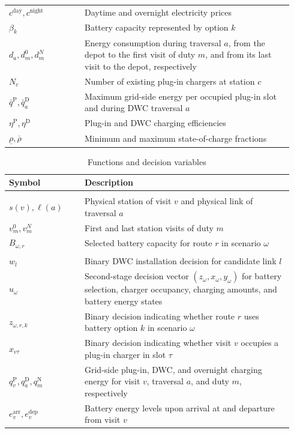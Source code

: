 \begin{table}[htbp]
\begin{tabular}{@{}>{\raggedright\arraybackslash}p{0.25\linewidth}>{\raggedright\arraybackslash}p{0.69\linewidth}@{}}
$c^{\mathrm{day}},c^{\mathrm{night}}$ & Daytime and overnight electricity prices \\
$\beta_k$ & Battery capacity represented by option $k$ \\
$d_a,d_m^0,d_m^N$ & Energy consumption during traversal $a$, from the depot to the first visit of duty $m$, and from its last visit to the depot, respectively \\
$N_c$ & Number of existing plug-in chargers at station $c$ \\
$\bar q^{\mathrm P},\bar q_a^{\mathrm D}$ & Maximum grid-side energy per occupied plug-in slot and during DWC traversal $a$ \\
$\eta^{\mathrm P},\eta^{\mathrm D}$ & Plug-in and DWC charging efficiencies \\
$\underline\rho,\overline\rho$ & Minimum and maximum state-of-charge fractions \\
\bottomrule
\end{tabular}
\end{table}

\begin{table}[htbp]
\centering
\footnotesize
\setlength{\tabcolsep}{3pt}
\renewcommand{\arraystretch}{1.0}
\caption{Functions and decision variables}
\begin{tabular}{@{}>{\raggedright\arraybackslash}p{0.25\linewidth}>{\raggedright\arraybackslash}p{0.69\linewidth}@{}}
\toprule
\textbf{Symbol} & \textbf{Description} \\
\midrule
\multicolumn{2}{@{}l}{\textit{Functions and derived quantities}} \\
$s(v),\ell(a)$ & Physical station of visit $v$ and physical link of traversal $a$ \\
$v_m^0,v_m^N$ & First and last station visits of duty $m$ \\
$B_{\omega,r}$ & Selected battery capacity for route $r$ in scenario $\omega$ \\
\addlinespace
\multicolumn{2}{@{}l}{\textit{Decision variables}} \\
$w_l$ & Binary DWC installation decision for candidate link $l$ \\
$u_\omega$ & Second-stage decision vector $(z_\omega,x_\omega,y_\omega)$ for battery selection, charger occupancy, charging amounts, and battery energy states \\
$z_{\omega,r,k}$ & Binary decision indicating whether route $r$ uses battery option $k$ in scenario $\omega$ \\
$x_{v\tau}$ & Binary decision indicating whether visit $v$ occupies a plug-in charger in slot $\tau$ \\
$q_v^{\mathrm P},q_a^{\mathrm D},q_m^{\mathrm N}$ & Grid-side plug-in, DWC, and overnight charging energy for visit $v$, traversal $a$, and duty $m$, respectively \\
$e_v^{\mathrm{arr}},e_v^{\mathrm{dep}}$ & Battery energy levels upon arrival at and departure from visit $v$ \\
\bottomrule
\end{tabular}
\end{table}
